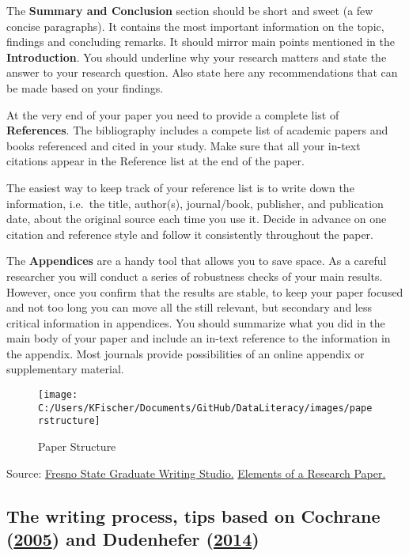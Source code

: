 \documentclass[
]{book}
\begin{document}
The \textbf{Summary and Conclusion} section should be short and sweet (a
few concise paragraphs). It contains the most important information on
the topic, findings and concluding remarks. It should mirror main points
mentioned in the \textbf{Introduction}. You should underline why your
research matters and state the answer to your research question. Also
state here any recommendations that can be made based on your findings.

At the very end of your paper you need to provide a complete list of
\textbf{References}. The bibliography includes a compete list of
academic papers and books referenced and cited in your study. Make sure
that all your in-text citations appear in the Reference list at the end
of the paper.

The easiest way to keep track of your reference list is to write down
the information, i.e.~the title, author(s), journal/book, publisher, and
publication date, about the original source each time you use it. Decide
in advance on one citation and reference style and follow it
consistently throughout the paper.

The \textbf{Appendices} are a handy tool that allows you to save space.
As a careful researcher you will conduct a series of robustness checks
of your main results. However, once you confirm that the results are
stable, to keep your paper focused and not too long you can move all the
still relevant, but secondary and less critical information in
appendices. You should summarize what you did in the main body of your
paper and include an in-text reference to the information in the
appendix. Most journals provide possibilities of an online appendix or
supplementary material.

\begin{figure}

{\centering \texttt{[image: C:/Users/KFischer/Documents/GitHub/DataLiteracy/images/paperstructure]} 

}

\caption{Paper Structure}\label{fig:paper_structure}
\end{figure}

Source:
\href{http://www.fresnostate.edu/academics/gradstudies/graduatewritingstudio.html}{Fresno
State Graduate Writing Studio.}
\href{https://fresnostategraduatewritingstudio.files.wordpress.com/2015/09/elements-of-a-research-paper.pdf}{Elements
of a Research Paper.}

\hypertarget{the-writing-process-tips-based-on-cochrane_writing_2005-and-dudenhefer_guide_2014}{%
\subsection{\texorpdfstring{The writing process, tips based on Cochrane
(\protect\hyperlink{ref-cochrane_writing_2005}{2005}) and Dudenhefer
(\protect\hyperlink{ref-dudenhefer_guide_2014}{2014})}{The writing process, tips based on Cochrane (2005) and Dudenhefer (2014)}}\label{the-writing-process-tips-based-on-cochrane_writing_2005-and-dudenhefer_guide_2014}}
\end{document}
